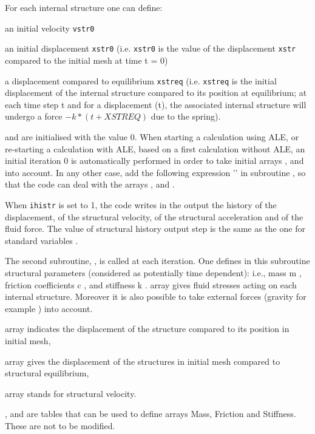 {For each internal structure one can define:
\begin{list}{-}{}
 \item an initial velocity \texttt{vstr0}
 \item an initial displacement \texttt{xstr0} (i.e. \texttt{xstr0} is the value of the
 displacement \texttt{xstr} compared to the initial mesh at time t = 0)
 \item a displacement compared to equilibrium  \texttt{xstreq} (i.e. \texttt{xstreq}
 is the initial displacement of the internal structure compared to its position at
 equilibrium; at each time step t and for a displacement (t), the associated
 internal structure will undergo a force $-k*(\text{}t+XSTREQ)$ due to the spring).
\end{list}
 and  are initialised with the value 0.
When starting a calculation using ALE, or re-starting a calculation with ALE, based
 on a first calculation without ALE, an initial iteration 0 is automatically performed
 in order to take initial arrays ,  and  into
 account. In any other case, add the following expression '' in subroutine
 , so that the code can deal with the arrays ,  and .

When \texttt{ihistr} is set to 1, the code writes in the output the history of the
 displacement, of the structural velocity, of the structural acceleration and of the
 fluid force. The value of structural history output step is the same as the one for
 standard variables .

The second subroutine, , is called at each iteration. One defines in this
 subroutine structural parameters (considered as potentially time dependent): i.e.,
 mass m , friction coefficients c , and stiffness k .
  array gives fluid stresses acting on each internal structure. Moreover it is also
 possible to take external forces (gravity for example ) into account.
\begin{list}{.}{}
 \item {} array indicates the displacement of the structure compared to its position in initial mesh,
 \item {} array gives the displacement of the structures in initial mesh
 compared to structural equilibrium,
 \item {} array stands for structural velocity.
\end{list}
,  and  are  tables that can be used to
 define arrays Mass, Friction and Stiffness. These are not to be modified.

}
